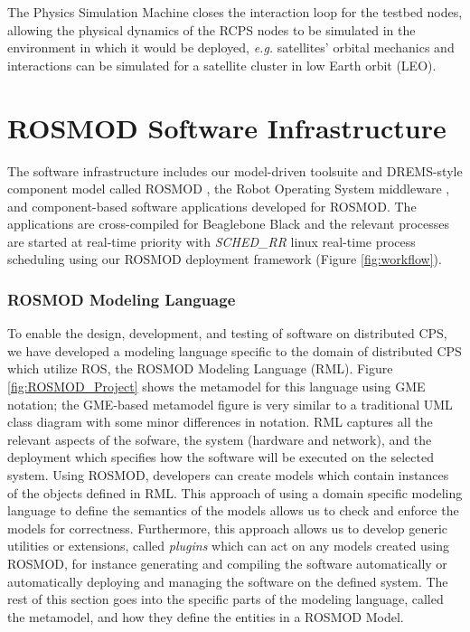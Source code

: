The Physics Simulation Machine closes the interaction loop for the testbed nodes, allowing the physical dynamics of the RCPS nodes to be simulated in the environment in which it would be deployed, \emph{e.g.} satellites' orbital mechanics and interactions can be simulated for a satellite cluster in low Earth orbit (LEO). 

\section{ROSMOD Software Infrastructure}

The software infrastructure includes our model-driven toolsuite and DREMS-style component model called ROSMOD \cite{kumarROSMOD}, the Robot Operating System middleware \cite{ROS}, and component-based software applications developed for ROSMOD. The applications are cross-compiled for Beaglebone Black and the relevant processes are started at real-time priority with \emph{SCHED\_RR} linux real-time process scheduling using our ROSMOD deployment framework (Figure \ref{fig:workflow}).

\subsubsection{ROSMOD Modeling Language}

To enable the design, development, and testing of software on distributed CPS, we have developed a modeling language specific to the domain of distributed CPS which utilize ROS, the ROSMOD Modeling Language (RML). Figure \ref{fig:ROSMOD_Project} shows the metamodel for this language using GME \cite{Ledeczi01thegeneric} notation; the GME-based metamodel figure is very similar to a traditional UML class diagram with some minor differences in notation. RML captures all the relevant aspects of the sofware, the system (hardware and network), and the deployment which specifies how the software will be executed on the selected system.  Using ROSMOD, developers can create models which contain instances of the objects defined in RML. This approach of using a domain specific modeling language to define the semantics of the models allows us to check and enforce the models for correctness.  Furthermore, this approach allows us to develop generic utilities or extensions, called \emph{plugins} \cite{maroti2014next} which can act on any models created using ROSMOD, for instance generating and compiling the software automatically or automatically deploying and managing the software on the defined system. The rest of this section goes into the specific parts of the modeling language, called the metamodel, and how they define the entities in a ROSMOD Model.

